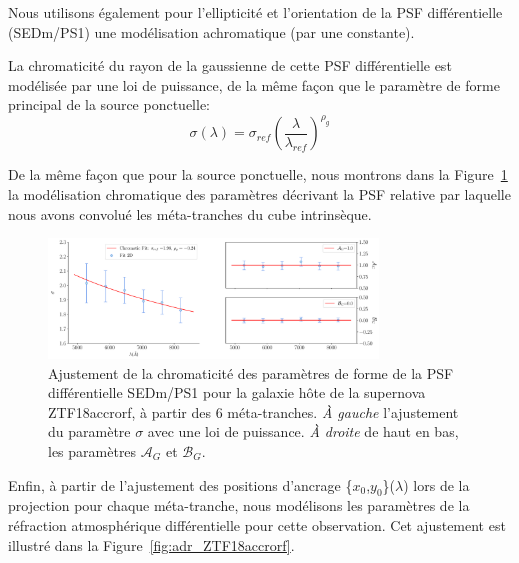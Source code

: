 \documentclass[../main/main.tex]{subfiles}
\begin{document}
Nous utilisons également pour l'ellipticité et l'orientation de la PSF
différentielle (SEDm/PS1) une modélisation achromatique (par une constante).

La chromaticité du rayon de la gaussienne de cette PSF différentielle est
modélisée par une loi de puissance, de la même façon que le paramètre de forme principal de la
source ponctuelle:
\begin{equation}
  \label{eq:sigmahostchrom}
  \sigma(\lambda)=\sigma_{ref}\left(\frac{\lambda}{\lambda_{ref}}\right)^{\rho_{g}}
\end{equation}

De la même façon que pour la source ponctuelle, nous montrons dans la Figure~\ref{fig:chromaticity_host} la
modélisation chromatique des paramètres décrivant la PSF relative par
laquelle nous avons convolué les méta-tranches du cube intrinsèque.

\begin{figure}[ht]
  \centering
  \includegraphics[width=0.78\textwidth]{../figures/07_scene/chromaticity_hostZTF18accrorf.pdf}
  \caption[Chromaticité des paramètres de forme de la PSF relative
  SEDm/PS1 pour l'hôte de ZTF18accrorf]{Ajustement de
    la chromaticité
    des paramètres de forme de la PSF différentielle SEDm/PS1 pour la galaxie
    hôte de la supernova ZTF18accrorf, à
    partir des 6 méta-tranches. \emph{À gauche} l'ajustement du paramètre $\sigma$ avec une
    loi de puissance. \emph{À droite} de haut en bas, les
    paramètres $\mathcal{A}_{G}$ et $\mathcal{B}_{G}$.}
  \label{fig:chromaticity_host}
\end{figure}

Enfin, à partir de l'ajustement des positions d'ancrage
\{$x_{0}$,$y_{0}$\}($\lambda$) lors de la
projection pour chaque méta-tranche, nous modélisons les paramètres de la réfraction atmosphérique
différentielle pour cette observation. Cet ajustement est illustré dans
la Figure~\ref{fig:adr_ZTF18accrorf}.
\end{document}
